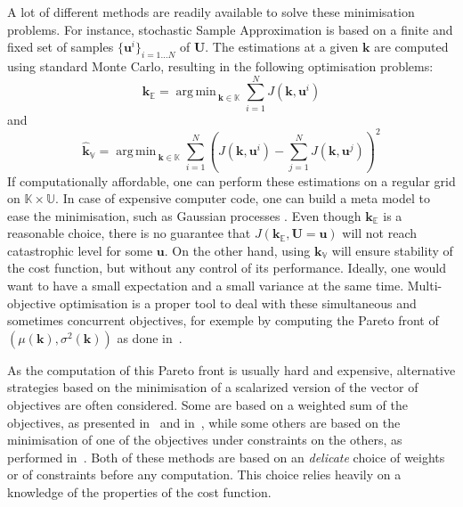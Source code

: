 \documentclass[preprint, review, 1p]{elsarticle}
\DeclareMathOperator*{\argmin}{arg\,min \,}
\newcommand{\Ex}{\mathbb{E}}
\newcommand{\Prob}{\mathbb{P}}
\newcommand{\kmean}{{\mathbf{k}}_{\Ex}}
\newcommand{\hatkmean}{\hat{\mathbf{k}}_{\Ex}}
\newcommand{\kvar}{{\mathbf{k}}_{\mathbb{V}}}
\newcommand{\hatkvar}{\hat{\mathbf{k}}_{\mathbb{V}}}
\newcommand{\Kspace}{\mathbb{K}}
\newcommand{\Uspace}{\mathbb{U}}
\begin{document}
A lot of different methods are readily available to solve these
minimisation problems. For instance, stochastic Sample Approximation
\citep{juditsky_stochastic_2009,kim_guide_2015} is based on a finite
and fixed set of samples $\{ \mathbf{u}^{i}\}_{i=1 \dots N}$ of
$\mathbf{U}$.
The estimations at a given $\mathbf{k}$ are computed using standard Monte Carlo, resulting in the following optimisation problems:
\begin{equation}
\hatkmean = \argmin_{\mathbf{k} \in \Kspace} \sum_{i=1}^N  J(\mathbf{k},\mathbf{u}^i)
\end{equation}
and
\begin{equation}
\hatkvar = \argmin_{\mathbf{k} \in \Kspace} \sum_{i=1}^N  \left( J(\mathbf{k},\mathbf{u}^i) -  \sum_{j=1}^N  J(\mathbf{k},\mathbf{u}^j) \right )^2
\end{equation}
If computationally affordable, one can perform these estimations on a regular grid on $\Kspace \times \Uspace$. In case of expensive computer code, one can build a meta model to ease the minimisation, such as Gaussian processes \citep{janusevskis_simultaneous_2010}.
Even though $\kmean$ is a reasonable choice, there is no guarantee that $J(\kmean, \mathbf{U}=\mathbf{u})$ will not reach catastrophic level for some  $\mathbf{u}$. On the other hand, using $\kvar$ will ensure stability of the cost function, but without any control of its performance. %
%
%
Ideally, one would want to have a small expectation and a small variance at the same time. Multi-objective optimisation is a proper tool to deal with these simultaneous and sometimes concurrent objectives, for exemple by computing the Pareto front of $\left(\mu(\mathbf{k}),\sigma^2(\mathbf{k})\right)$ as done in~\cite{baudoui_optimisation_2012}.

As the computation of this Pareto front is usually hard and expensive, alternative strategies based on the minimisation of a scalarized version of the vector of objectives are often considered. Some are based on a weighted sum of the objectives, as presented in~\cite{grodzevich_normalization_2006} and in~\cite{marler_weighted_2010}, while some others are based on the minimisation of one of the objectives under constraints on the others, as performed in~\cite{lehman_designing_2004}. Both of these methods are based on an \textit{delicate} choice of weights or of constraints before any computation. This choice relies heavily on a knowledge of the properties of the cost function.
\end{document}

